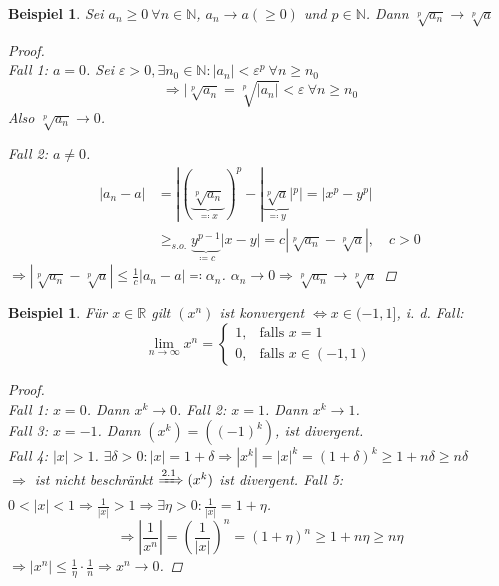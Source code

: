 \documentclass[titlepage,ngerman,a4paper,headsepline,DIV15,halfparskip*,14pt]{scrartcl}
\newcommand{\R}{\mathbb{R}}
\newcommand{\N}{\mathbb{N}}
\theoremstyle{dotless}
\newtheorem{beispiel}[satz]{Beispiel}
\begin{document}
\begin{beispiel} \label{bsp:2.4}
	Sei $a_{n} \geq 0 ~\forall n \in \N$, $a_{n} \rightarrow a (\geq 0)$ und $p \in \N$. Dann $\sqrt[p]{a_{n}} \rightarrow \sqrt[p]{a}$
	
	\begin{proof}~\\
		Fall 1: $a = 0$. Sei $\varepsilon > 0, \exists n_{0} \in \N: |a_{n}| < \varepsilon^{p} ~\forall n \geq n_{0}$
		$$
			\Rightarrow | \sqrt[p]{a_{n}} = \sqrt[p]{|a_{n}|} < \varepsilon ~\forall n \geq n_{0}
		$$
		Also $\sqrt[p]{a_{n}} \rightarrow 0$. \newline
		
		Fall 2: $a \neq 0$.
		\begin{align*}
			|a_{n} - a| & = | (\underbrace{\sqrt[p]{a_{n}}}_{\eqqcolon x})^{p} - |\underbrace{\sqrt[p]{a}}_{\eqqcolon y}|^{p} | =  |x^{p} - y^{p}| \\
					& \geq_{s.o.} \underbrace{y^{p-1}}_{\coloneqq c} |x - y| = c | \sqrt[p]{a_{n}} - \sqrt[p]{a} |, \quad c > 0
		\end{align*}
		$\Rightarrow |\sqrt[p]{a_{n}} - \sqrt[p]{a}| \leq \frac{1}{c} |a_{n} - a| \eqqcolon \alpha_{n}$. $\alpha_{n} \rightarrow 0 \Rightarrow \sqrt[p]{a_{n}} \rightarrow \sqrt[p]{a}$
	\end{proof} 
\end{beispiel}


\begin{beispiel} \label{bsp:2.5}
	Für $x \in \R$ gilt $(x^{n})$ ist konvergent $\iff x \in (-1,1]$, i. d. Fall:
	$$
		\lim_{n \rightarrow \infty} x^{n} = \begin{cases} 1, & \text{falls } x = 1 \\ 0, & \text{falls } x \in (-1 , 1) \end{cases}
	$$
	
	\begin{proof}~\\
		Fall 1: $x = 0$. Dann $x^{k} \rightarrow 0$. Fall 2: $x = 1$. Dann $x^{k} \rightarrow 1$. \\
		Fall 3: $x = -1$. Dann $(x^{k}) = ((-1)^{k})$, ist divergent. \\
		Fall 4: $|x| > 1$. $\exists \delta > 0: |x| = 1 + \delta \Rightarrow |x^{k}| = |x|^{k} = (1 + \delta)^{k} \geq 1 + n \delta \geq n \delta$ \\
		 $\Rightarrow$ ist nicht beschränkt $\xRightarrow[]{2.1} (x^{k})$ ist divergent.
		Fall 5: $0 < |x| < 1 \Rightarrow \frac{1}{|x|} > 1 \Rightarrow \exists \eta > 0: \frac{1}{|x|} = 1 + \eta$.
		$$
			\Rightarrow |\frac{1}{x^{n}}| = \left( \frac{1}{|x|} \right)^{n} = (1 + \eta)^{n} \geq 1 + n \eta \geq n \eta
		$$
		$\Rightarrow |x^{n}| \leq \frac{1}{\eta} \cdot \frac{1}{n} \Rightarrow x^{n} \rightarrow 0$.
	\end{proof}	
\end{beispiel}
\end{document}
